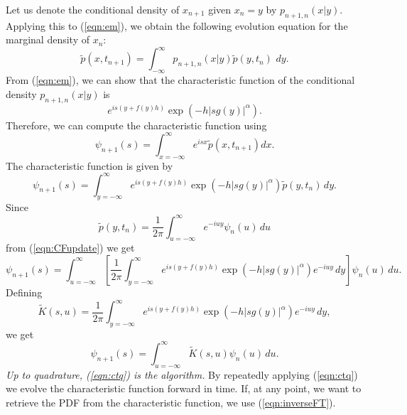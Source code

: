 \documentclass[11pt,letterpaper]{article}
\begin{document}
Let us denote the conditional density of $x_{n+1}$ given $x_n = y$ by $p_{n+1, n}(x | y)$.  Applying this to (\ref{eqn:em}), we obtain the following evolution equation for the marginal density of $x_n$:
\begin{equation}
\label{dtq}
\widetilde{p}(x, t_{n+1})=\int_{-\infty}^\infty p_{n+1, n}(x | y ) \widetilde{p}(y, t_n) \, \, dy.
\end{equation}
\noindent
From (\ref{eqn:em}), we can show that the characteristic function of the conditional density $p_{n+1, n}(x | y )$  is
\[
e^{is \left(y+ f(y)h \right)}\exp (- h |s g(y)|^{\alpha} ).
\]
Therefore, we can compute the characteristic function using
\begin{equation}
\label{eqn:CFdefn}
\psi_{n+1}(s) = \int_{x=-\infty}^{\infty}e^{isx}\widetilde{p}(x,t_{n+1})dx.
\end{equation}
The characteristic function is given by
\begin{equation}
\label{eqn:CFupdate}
\psi_{n+1}(s) = \int_{y=-\infty}^{\infty}e^{is\left(y+f(y)h\right)}\exp{\left(  -h |s g(y)|^{\alpha} \right)}\widetilde{p}(y, t_n) \, dy.
\end{equation}
Since
\begin{equation}
\label{eqn:inverseFT}
\widetilde{p}(y, t_n) = \frac{1}{2\pi}\int_{u=-\infty}^{\infty}e^{-iuy}\psi_{n}(u)\, du
\end{equation}
from (\ref{eqn:CFupdate}) we get
\begin{equation}
\psi_{n+1}(s) =  \int_{u=-\infty}^{\infty}\left[\frac{1}{2\pi}\int_{y=-\infty}^{\infty}e^{is\left(y+f(y)h\right)}\exp{\left(  -h |s g(y)|^{\alpha} \right)}e^{-iuy}\, dy \right]\psi_{n}(u) \, du.\nonumber
\end{equation}
Defining
\begin{equation}
\label{eqn:kdef}
\widetilde{K}(s,u) = \frac{1}{2\pi}\int_{y=-\infty}^{\infty}e^{is\left(y+f(y)h\right)}\exp{\left(  -h |s g(y)|^{\alpha} \right)}e^{-iuy}\, dy,
\end{equation}
we get
\begin{equation}
\label{eqn:ctq}
\psi_{n+1}(s) =  \int_{u=-\infty}^{\infty}\widetilde{K}(s,u)\psi_{n}(u) \, du.
\end{equation}
\emph{Up to quadrature, (\ref{eqn:ctq}) is the algorithm.} By repeatedly applying (\ref{eqn:ctq}) we evolve the characteristic function forward in time.  If, at any point, we want to retrieve the PDF from the characteristic function, we use (\ref{eqn:inverseFT}).
\end{document}
